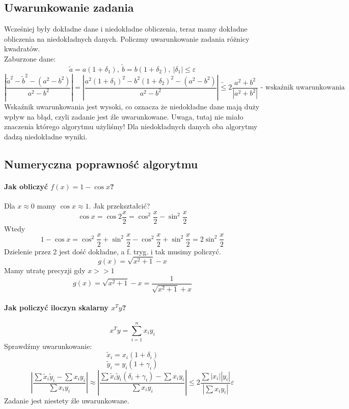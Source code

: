 \documentclass{article}
\begin{document}
\subsection{Uwarunkowanie zadania}
Wcześniej były dokładne dane i niedokładne obliczenia, teraz mamy dokładne obliczenia na niedokładnych danych. Policzmy uwarunkowanie zadania różnicy kwadratów.\\
Zaburzone dane:
$$\tilde{a}=a(1+\delta_1),\ \tilde{b}=b(1+\delta_2), \ |\delta_1|\le\varepsilon$$
$$|\frac{\tilde{a}^2-\tilde{b}^2-(a^2-b^2)}{a^2-b^2}| = |\frac{a^2(1+\delta_1)^2-b^2(1+\delta_2)^2-(a^2-b^2)}{a^2-b^2}| \tilde{\le}2\frac{a^2+b^2}{|a^2+b^2|} 
\text{ - wskaźnik uwarunkowania} $$ 
Wskaźnik uwarunkowania jest wysoki, co oznacza że niedokładne dane mają duży wpływ na błąd, czyli zadanie jest źle uwarunkowane. Uwaga, tutaj nie miało znaczenia którego algorytmu użyliśmy! Dla niedokładnych danych oba algorytmy dadzą niedokładne wyniki.
\subsection{Numeryczna poprawność algorytmu}
\paragraph{Jak obliczyć $ f(x)=1-\cos x $?}
Dla $ x\approx 0 $ mamy $ \cos x\approx 1 $.
Jak przekształcić? $$ \cos x=\cos2\frac x2=\cos^2\frac x2-\sin^2\frac x2 $$ Wtedy 
$$ 1-\cos x= \cos^2\frac x2+\sin^2\frac x2-\cos^2\frac{x}{2}+\sin^2\frac x2=2\sin^2\frac x2$$
Dzielenie przez 2 jest dość dokładne, a f. tryg. i tak musimy policzyć.
$$g(x)=\sqrt{x^2+1}-x$$
Mamy utratę precyzji gdy $ x>>1 $
$$g(x)=\sqrt{x^2+1}-x=\frac1{\sqrt{x^2+1}+x}$$
\paragraph{Jak policzyć iloczyn skalarny $ x^Ty $?}
$$ x^Ty=\sum_{i=1}^n x_iy_i $$
Sprawdźmy uwarunkowanie:
$$\tilde{x}_i=x_i(1+\delta_i)$$
$$\tilde{y}_i=y_i(1+\gamma_i)$$
$$|\frac{\sum\tilde{x}_i\tilde{y}_i-\sum x_iy_i}{\sum x_iy_i}| \approx |\frac{\sum\tilde{x}_i\tilde{y}_i(\delta_i+\gamma_i)-\sum x_iy_i}{\sum x_iy_i}|\le2\frac{\sum|x_i||y_i|}{|\sum x_iy_i|}\varepsilon$$
Zadanie jest niestety źle uwarunkowane.
\end{document}
